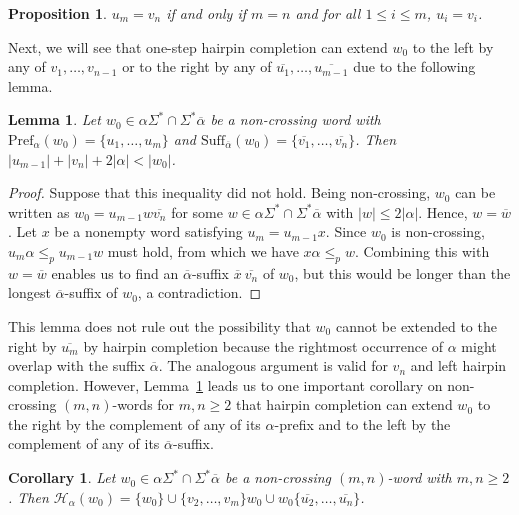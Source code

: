 \documentclass{article}
\theoremstyle{plain}
\newtheorem{lemma}{Lemma}
\newtheorem{proposition}{Proposition}
\newtheorem{corollary}{Corollary}
\theoremstyle{remark}
\newcommand{\HC}{\ensuremath{\mathcal{H}}}
\newcommand{\Pref}{\ensuremath{\mathrm{Pref}}}
\newcommand{\Suff}{\ensuremath{\mathrm{Suff}}}
\newcommand{\calpha}{\ensuremath{\overline{\alpha}}}
\begin{document}
\begin{proposition}\label{prop:mirror}
	$u_m = v_n$ if and only if $m = n$ and for all $1 \le i \le m$, $u_i = v_i$. 
\end{proposition}

Next, we will see that one-step hairpin completion can extend $w_0$ to the left by any of $v_1, \ldots, v_{n-1}$ or to the right by any of $\overline{u_1}, \ldots, \overline{u_{m-1}}$ due to the following lemma. 

\begin{lemma}\label{lem:length_nonoverlap_apref_casuf}
	Let $w_0 \in \alpha \Sigma^* \cap \Sigma^* \overline{\alpha}$ be a non-crossing word with $\Pref_\alpha(w_0) = \{u_1, \ldots, u_m\}$ and $\Suff_{\overline{\alpha}}(w_0) = \{\overline{v_1}, \ldots, \overline{v_n}\}$. 
	Then $|u_{m-1}| + |v_n| + 2|\alpha| < |w_0|$. 
\end{lemma}
\begin{proof}
	Suppose that this inequality did not hold. 
	Being non-crossing, $w_0$ can be written as $w_0 = u_{m-1} w \overline{v_n}$ for some $w \in \alpha \Sigma^* \cap \Sigma^* \overline{\alpha}$ with $|w| \le 2|\alpha|$. 
	Hence, $w = \overline{w}$. 
	Let $x$ be a nonempty word satisfying $u_m = u_{m-1}x$. 
	Since $w_0$ is non-crossing, $u_m \alpha \le_p u_{m-1} w$ must hold, from which we have $x \alpha \le_p w$. 
	Combining this with $w = \overline{w}$ enables us to find an $\calpha$-suffix $\overline{x} \ \overline{v_n}$ of $w_0$, but this would be longer than the longest $\overline{\alpha}$-suffix of $w_0$, a contradiction. 
\end{proof}

This lemma does not rule out the possibility that $w_0$ cannot be extended to the right by $\overline{u_m}$ by hairpin completion because the rightmost occurrence of $\alpha$ might overlap with the suffix $\calpha$. 
The analogous argument is valid for $v_n$ and left hairpin completion. 
However, Lemma~\ref{lem:length_nonoverlap_apref_casuf} leads us to one important corollary on non-crossing $(m, n)$-words for $m, n \ge 2$ that hairpin completion can extend $w_0$ to the right by the complement of any of its $\alpha$-prefix and to the left by the complement of any of its $\calpha$-suffix. 

\begin{corollary}\label{cor:1st_step_mn_ge2}
	Let $w_0 \in \alpha \Sigma^* \cap \Sigma^* \overline{\alpha}$ be a non-crossing $(m, n)$-word with $m, n \ge 2$. 
	Then $\HC_\alpha(w_0) = \{w_0\} \cup \{v_2, \ldots, v_m\}w_0 \cup w_0\{\overline{u_2}, \ldots, \overline{u_n}\}$. 
\end{corollary}
\end{document}
